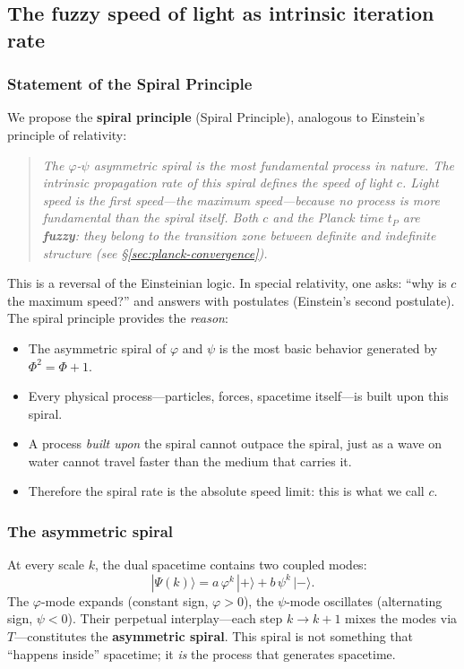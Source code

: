\documentclass[12pt,a4paper]{article}
\begin{document}
\subsection{The fuzzy speed of light as intrinsic iteration rate}
\label{sec:spiral-principle}

\subsubsection{Statement of the Spiral Principle}

We propose the \textbf{spiral principle} (Spiral Principle), analogous to Einstein's principle of relativity:

\begin{quote}
\itshape
The $\varphi$-$\psi$ asymmetric spiral is the most fundamental process in nature. The intrinsic propagation rate of this spiral defines the speed of light $c$. Light speed is the first speed---the maximum speed---because no process is more fundamental than the spiral itself. Both $c$ and the Planck time $t_P$ are \textbf{fuzzy}: they belong to the transition zone between definite and indefinite structure (see \S\ref{sec:planck-convergence}).
\end{quote}

This is a reversal of the Einsteinian logic. In special relativity, one asks: ``why is $c$ the maximum speed?'' and answers with postulates (Einstein's second postulate). The spiral principle provides the \emph{reason}:

\begin{itemize}
\item The asymmetric spiral of $\varphi$ and $\psi$ is the most basic behavior generated by $\Phi^2 = \Phi + 1$.
\item Every physical process---particles, forces, spacetime itself---is built upon this spiral.
\item A process \emph{built upon} the spiral cannot outpace the spiral, just as a wave on water cannot travel faster than the medium that carries it.
\item Therefore the spiral rate is the absolute speed limit: this is what we call $c$.
\end{itemize}

\subsubsection{The asymmetric spiral}

At every scale $k$, the dual spacetime contains two coupled modes:
\begin{equation}
|\Psi(k)\rangle = a\,\varphi^k\,|{+}\rangle + b\,\psi^k\,|{-}\rangle.
\end{equation}
The $\varphi$-mode expands (constant sign, $\varphi > 0$), the $\psi$-mode oscillates (alternating sign, $\psi < 0$). Their perpetual interplay---each step $k \to k+1$ mixes the modes via $T$---constitutes the \textbf{asymmetric spiral}. This spiral is not something that ``happens inside'' spacetime; it \emph{is} the process that generates spacetime.
\end{document}
